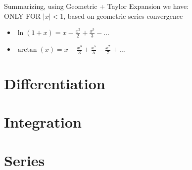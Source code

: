 \documentclass[a4paper, 12pt]{article}
\begin{document}
Summarizing, using Geometric + Taylor Expansion we have: \\
ONLY FOR $|x|<1$, based on geometric series convergence
\begin{itemize}
    \item $\displaystyle \ln(1+x) = x - \frac{x^2}{2} + \frac{x^3}{3} - \dots$ 
    \item $\displaystyle \arctan(x) = x - \frac{x^3}{3} + \frac{x^5}{5} -
    \frac{x^7}{7} + \dots$ 
\end{itemize}


\section{Differentiation}

\section{Integration}

\section{Series}
\end{document}
